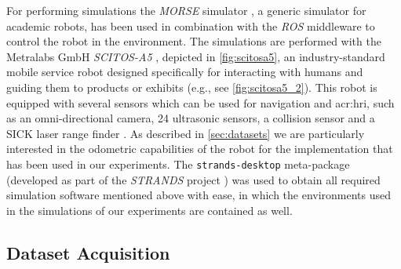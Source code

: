 For performing simulations the \textit{MORSE} simulator \cite{morse_simpar_2012}, a generic simulator for academic robots, has been used in combination with the \textit{ROS} middleware to control the robot in the environment.
The simulations are performed with the Metralabs GmbH \textit{SCITOS-A5} \cite{Metralabs}, depicted in \autoref{fig:scitosa5}, an industry-standard mobile service robot designed specifically for interacting with humans and guiding them to products or exhibits (e.g., see \autoref{fig:scitosa5_2}).
This robot is equipped with several sensors which can be used for navigation and \acrfull{acr:hri}, such as an omni-directional camera, 24 ultrasonic sensors, a collision sensor and a SICK laser range finder \cite{gross2008shopbot}.
As described in \autoref{sec:datasets} we are particularly interested in the odometric capabilities of the robot for the implementation that has been used in our experiments.
The \texttt{strands-desktop} meta-package (developed as part of the \textit{STRANDS} project \cite{hawes2016strands}) was used to obtain all required simulation software mentioned above with ease, in which the environments used in the simulations of our experiments are contained as well.



%


\subsection{Dataset Acquisition}
\label{sec:datasets}

